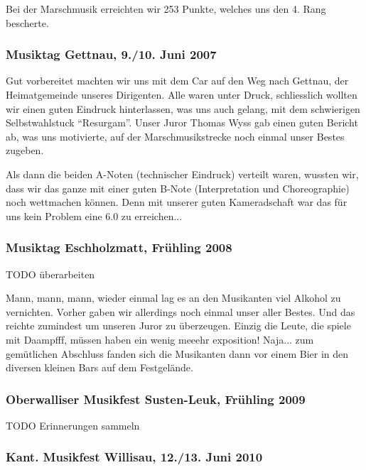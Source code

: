 \begin{history}
    Bei der Marschmusik erreichten wir 253 Punkte, welches uns den 4. Rang
    bescherte.

    \subsubsection*{Musiktag Gettnau, 9./10. Juni 2007}

    Gut vorbereitet machten wir uns mit dem Car auf den Weg nach Gettnau, der
    Heimatgemeinde unseres Dirigenten. Alle waren unter Druck, schliesslich
    wollten wir einen guten Eindruck hinterlassen, was uns auch gelang, mit dem
    schwierigen Selbstwahlstuck \enquote{Resurgam}. Unser Juror Thomas Wyss gab
    einen guten Bericht ab, was uns motivierte, auf der Marschmusikstrecke noch
    einmal unser Bestes zugeben.

    Als dann die beiden A-Noten (technischer Eindruck) verteilt waren, wussten
    wir, dass wir das ganze mit einer guten B-Note (Interpretation und
    Choreographie) noch wettmachen können. Denn mit unserer guten Kameradschaft
    war das für uns kein Problem eine 6.0 zu erreichen...


    \subsubsection*{Musiktag Eschholzmatt, Frühling 2008}

    TODO überarbeiten

    Mann, mann, mann, wieder einmal lag es an den Musikanten viel Alkohol zu
    vernichten. Vorher gaben wir allerdings noch einmal unser aller Bestes. Und
    das reichte zumindest um unseren Juror zu überzeugen. Einzig die Leute, die
    spiele mit Daampfff, müssen haben ein wenig meeehr exposition! Naja... zum
    gemütlichen Abschluss fanden sich die Musikanten dann vor einem Bier in den
    diversen kleinen Bars auf dem Festgelände.


    \subsubsection*{Oberwalliser Musikfest Susten-Leuk, Frühling 2009}

    TODO Erinnerungen sammeln


    \subsubsection*{Kant. Musikfest Willisau, 12./13. Juni 2010}


\end{history}
